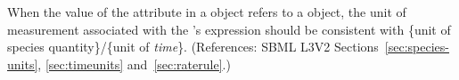 When the value of the attribute  in a \RateRule object
refers to a \Species object, the unit of measurement associated with the
\RateRule's  expression should be consistent with \{unit of
species quantity\}/\{unit of \emph{time}\}.  (References: SBML L3V2
Sections~\ref{sec:species-units}, \ref{sec:timeunits}
and~\ref{sec:raterule}.)
